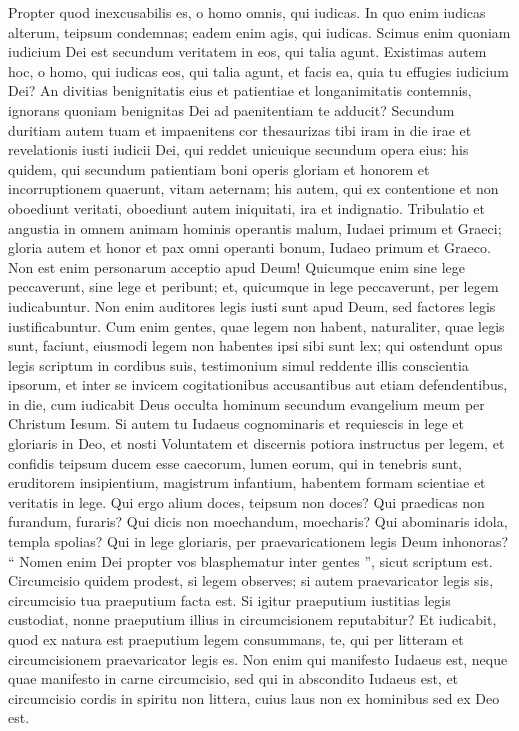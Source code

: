 \begin{biblechapter}
\begin{biblechapter}
\verse Propter quod inexcusabilis es, o homo omnis, qui iudicas. In quo enim iudicas alterum, teipsum condemnas; eadem enim agis, qui iudicas. 
\verse Scimus enim quoniam iudicium Dei est secundum veritatem in eos, qui talia agunt. 
\verse Existimas autem hoc, o homo, qui iudicas eos, qui talia agunt, et facis ea, quia tu effugies iudicium Dei? 
\verse An divitias benignitatis eius et patientiae et longanimitatis contemnis, ignorans quoniam benignitas Dei ad paenitentiam te adducit? 
\verse Secundum duritiam autem tuam et impaenitens cor thesaurizas tibi iram in die irae et revelationis iusti iudicii Dei, 
\verse qui reddet unicuique secundum opera eius: 
\verse his quidem, qui secundum patientiam boni operis gloriam et honorem et incorruptionem quaerunt, vitam aeternam; 
\verse his autem, qui ex contentione et non oboediunt veritati, oboediunt autem iniquitati, ira et indignatio. 
\verse Tribulatio et angustia in omnem animam hominis operantis malum, Iudaei primum et Graeci; 
\verse gloria autem et honor et pax omni operanti bonum, Iudaeo primum et Graeco. 
\verse Non est enim personarum acceptio apud Deum!
 \verse Quicumque enim sine lege peccaverunt, sine lege et peribunt; et, quicumque in lege peccaverunt, per legem iudicabuntur. 
\verse Non enim auditores legis iusti sunt apud Deum, sed factores legis iustificabuntur. 
\verse Cum enim gentes, quae legem non habent, naturaliter, quae legis sunt, faciunt, eiusmodi legem non habentes ipsi sibi sunt lex; 
\verse qui ostendunt opus legis scriptum in cordibus suis, testimonium simul reddente illis conscientia ipsorum, et inter se invicem cogitationibus accusantibus aut etiam defendentibus, 
\verse in die, cum iudicabit Deus occulta hominum secundum evangelium meum per Christum Iesum. 
 \verse Si autem tu Iudaeus cognominaris et requiescis in lege et gloriaris in Deo, 
 \verse et nosti Voluntatem et discernis potiora instructus per legem, 
\verse et confidis teipsum ducem esse caecorum, lumen eorum, qui in tenebris sunt, 
\verse eruditorem insipientium, magistrum infantium, habentem formam scientiae et veritatis in lege. 
\verse Qui ergo alium doces, teipsum non doces? Qui praedicas non furandum, furaris? 
\verse Qui dicis non moechandum, moecharis? Qui abominaris idola, templa spolias? 
\verse Qui in lege gloriaris, per praevaricationem legis Deum inhonoras? 
\verse “ Nomen enim Dei propter vos blasphematur inter gentes ”, sicut scriptum est.
 \verse Circumcisio quidem prodest, si legem observes; si autem praevaricator legis sis, circumcisio tua praeputium facta est. 
\verse Si igitur praeputium iustitias legis custodiat, nonne praeputium illius in circumcisionem reputabitur? 
\verse Et iudicabit, quod ex natura est praeputium legem consummans, te, qui per litteram et circumcisionem praevaricator legis es. 
\verse Non enim qui manifesto Iudaeus est, neque quae manifesto in carne circumcisio, 
\verse sed qui in abscondito Iudaeus est, et circumcisio cordis in spiritu non littera, cuius laus non ex hominibus sed ex Deo est.
 

\end{biblechapter}
\end{biblechapter}

